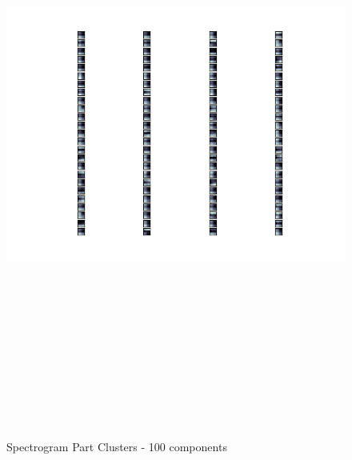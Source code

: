 \documentclass[11pt]{article}
\begin{document}
\begin{figure}[htb]
\centering
\includegraphics[height=20cm]{./spec_avg_parts_100.png}
\caption{\label{fig:spec_avg_parts_100}Spectrogram Part Clusters - 100 components}
\end{figure}
\end{document}
